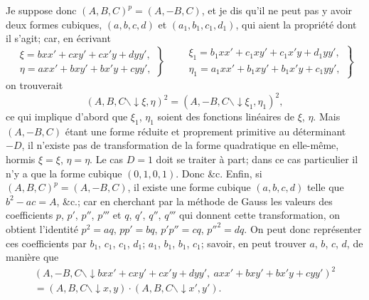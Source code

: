 \documentclass[11pt]{article}
\begin{document}
\medskip

Je suppose donc $(A, B, C)^{p} = (A, -B, C)$, et je dis qu'il ne peut pas y avoir
deux formes cubiques, $(a, b, c, d)$ et $(a_{1}, b_{1}, c_{1}, d_{1})$, qui aient la propri\'et\'e dont il s'agit;
car, en \'ecrivant
\[
\left.
\begin{array}{l}
\xi = bxx' + cxy' + cx'y + dyy',\\
\eta = axx' + bxy' + bx'y + cyy',
\end{array}
\right\}
\qquad
\left.
\begin{array}{l}
\xi_{1} = b_{1}xx' + c_{1}xy' + c_{1}x'y + d_{1}yy',\\
\eta_{1} = a_{1}xx' + b_{1}xy' + b_{1}x'y + c_{1}yy',
\end{array}
\right\}
\]
on trouverait
\[
(A, B, C \mathbin{\backslash\!\!\!\downarrow} \xi, \eta)^{2} = (A, -B, C \mathbin{\backslash\!\!\!\downarrow} \xi_{1}, \eta_{1})^{2},
\]
ce qui implique d'abord que $\xi_{1}$, $\eta_{1}$ soient des fonctions lin\'eaires de $\xi$, $\eta$. Mais $(A, -B, C)$
\'etant une forme r\'eduite et proprement primitive au d\'eterminant $-D$, il n'existe pas
de transformation de la forme quadratique en elle-m\^eme, hormis $\xi = \xi$, $\eta = \eta$. Le cas
$D = 1$ doit se traiter \`a part; dans ce cas particulier il n'y a que la forme cubique
$(0, 1, 0, 1)$. Donc \&c. Enfin, si $(A, B, C)^{p} = (A, -B, C)$, il existe une forme cubique
$(a, b, c, d)$ telle que $b^{2} - ac = A$, \&c.; car en cherchant par la m\'ethode de Gauss les
valeurs des coefficients $p$, $p'$, $p''$, $p'''$ et $q$, $q'$, $q''$, $q'''$ qui donnent cette transformation,
on obtient l'identit\'e $p^{2} = aq$, $pp' = bq$, $p'p'' = cq$, $p''^{2} = dq$. On peut donc repr\'esenter ces coefficients par
$b_{1}$, $c_{1}$, $c_{1}$, $d_{1}$; $a_{1}$, $b_{1}$, $b_{1}$, $c_{1}$; savoir, en peut trouver $a$, $b$, $c$, $d$, de mani\`ere que
\begin{multline*}
(A, -B, C \mathbin{\backslash\!\!\!\downarrow} bxx' + cxy' + cx'y + dyy',\ axx' + bxy' + bx'y + cyy')^{2}\\
= (A, B, C \mathbin{\backslash\!\!\!\downarrow} x, y) \cdot (A, B, C \mathbin{\backslash\!\!\!\downarrow} x', y').
\end{multline*}
\end{document}
